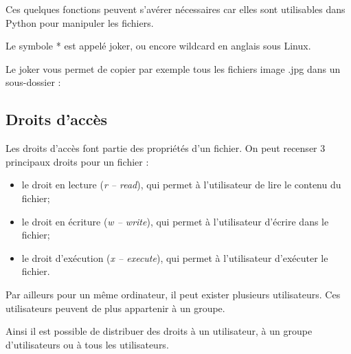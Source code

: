 Ces quelques fonctions peuvent s'avérer nécessaires car elles sont utilisables dans Python pour manipuler les fichiers. 


Le symbole * est appelé joker, ou encore wildcard en anglais sous Linux. 


Le joker vous permet de copier par exemple tous les fichiers image .jpg dans un sous-dossier :

\subsection{Droits d’accès}

Les droits d'accès font partie des propriétés d'un fichier. On peut recenser 3 principaux droits pour un fichier : 
\begin{itemize}
\item le droit en lecture (\textit{r -- read}), qui permet à l'utilisateur de lire le contenu du fichier;
\item le droit en écriture (\textit{w -- write}), qui permet à l'utilisateur d'écrire dans le fichier;
\item le droit d'exécution (\textit{x -- execute}), qui permet à l'utilisateur d'exécuter le fichier.
\end{itemize}

Par ailleurs pour un même ordinateur, il peut exister plusieurs utilisateurs. Ces utilisateurs peuvent de plus appartenir à un groupe.

Ainsi il est possible de distribuer des droits à un utilisateur, à un groupe d'utilisateurs ou à tous les utilisateurs.  

